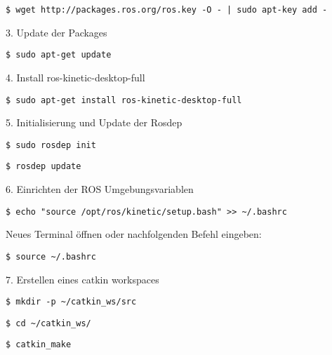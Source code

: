 \begin{lstlisting}
$ wget http://packages.ros.org/ros.key -O - | sudo apt-key add -
\end{lstlisting}

3. Update der Packages\\

\begin{lstlisting}
$ sudo apt-get update
\end{lstlisting}

4. Install ros-kinetic-desktop-full\\

\begin{lstlisting}
$ sudo apt-get install ros-kinetic-desktop-full
\end{lstlisting}

5. Initialisierung und Update der Rosdep\\

\begin{lstlisting}
$ sudo rosdep init
\end{lstlisting}

\begin{lstlisting}
$ rosdep update
\end{lstlisting}

6. Einrichten der ROS Umgebungsvariablen\\

\begin{lstlisting}
$ echo "source /opt/ros/kinetic/setup.bash" >> ~/.bashrc
\end{lstlisting}

Neues Terminal öffnen oder nachfolgenden Befehl eingeben:\\

\begin{lstlisting}
$ source ~/.bashrc
\end{lstlisting}

7. Erstellen eines catkin workspaces \\

\begin{lstlisting}
$ mkdir -p ~/catkin_ws/src
\end{lstlisting}

\begin{lstlisting}
$ cd ~/catkin_ws/
\end{lstlisting}

\begin{lstlisting}
$ catkin_make
\end{lstlisting}

